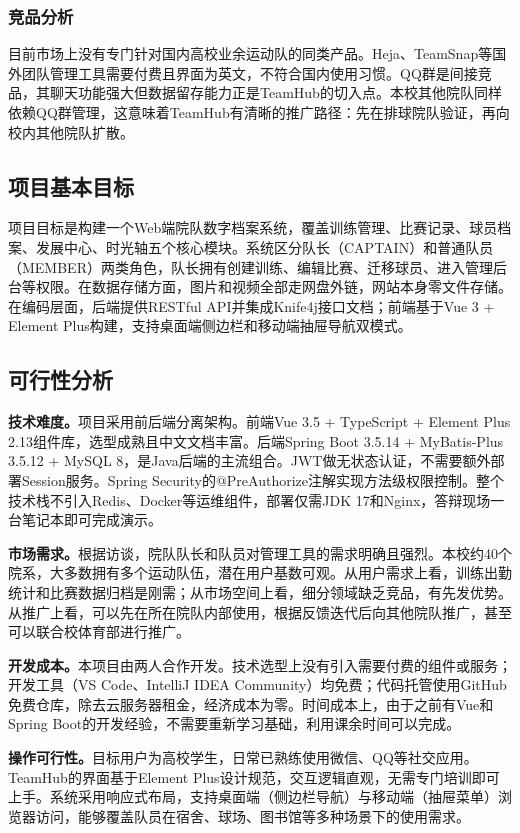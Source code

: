 \documentclass[12pt,a4paper]{ctexart}
\begin{document}
\subsubsection{竞品分析}

目前市场上没有专门针对国内高校业余运动队的同类产品。Heja、TeamSnap等国外团队管理工具需要付费且界面为英文，不符合国内使用习惯。QQ群是间接竞品，其聊天功能强大但数据留存能力正是TeamHub的切入点。本校其他院队同样依赖QQ群管理，这意味着TeamHub有清晰的推广路径：先在排球院队验证，再向校内其他院队扩散。

\subsection{项目基本目标}

项目目标是构建一个Web端院队数字档案系统，覆盖训练管理、比赛记录、球员档案、发展中心、时光轴五个核心模块。系统区分队长（CAPTAIN）和普通队员（MEMBER）两类角色，队长拥有创建训练、编辑比赛、迁移球员、进入管理后台等权限。在数据存储方面，图片和视频全部走网盘外链，网站本身零文件存储。在编码层面，后端提供RESTful API并集成Knife4j接口文档；前端基于Vue 3 + Element Plus构建，支持桌面端侧边栏和移动端抽屉导航双模式。

\subsection{可行性分析}

\textbf{技术难度。}项目采用前后端分离架构。前端Vue 3.5 + TypeScript + Element Plus 2.13组件库，选型成熟且中文文档丰富。后端Spring Boot 3.5.14 + MyBatis-Plus 3.5.12 + MySQL 8，是Java后端的主流组合。JWT做无状态认证，不需要额外部署Session服务。Spring Security的@PreAuthorize注解实现方法级权限控制。整个技术栈不引入Redis、Docker等运维组件，部署仅需JDK 17和Nginx，答辩现场一台笔记本即可完成演示。

\textbf{市场需求。}根据访谈，院队队长和队员对管理工具的需求明确且强烈。本校约40个院系，大多数拥有多个运动队伍，潜在用户基数可观。从用户需求上看，训练出勤统计和比赛数据归档是刚需；从市场空间上看，细分领域缺乏竞品，有先发优势。从推广上看，可以先在所在院队内部使用，根据反馈迭代后向其他院队推广，甚至可以联合校体育部进行推广。

\textbf{开发成本。}本项目由两人合作开发。技术选型上没有引入需要付费的组件或服务；开发工具（VS Code、IntelliJ IDEA Community）均免费；代码托管使用GitHub免费仓库，除去云服务器租金，经济成本为零。时间成本上，由于之前有Vue和Spring Boot的开发经验，不需要重新学习基础，利用课余时间可以完成。

\textbf{操作可行性。}目标用户为高校学生，日常已熟练使用微信、QQ等社交应用。TeamHub的界面基于Element Plus设计规范，交互逻辑直观，无需专门培训即可上手。系统采用响应式布局，支持桌面端（侧边栏导航）与移动端（抽屉菜单）浏览器访问，能够覆盖队员在宿舍、球场、图书馆等多种场景下的使用需求。
\end{document}
